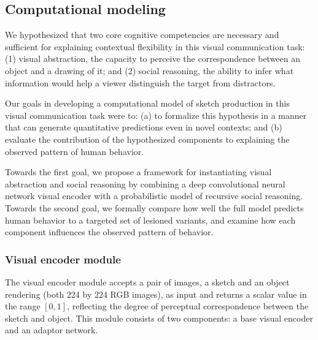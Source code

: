 \documentclass[9pt,twocolumn,twoside]{pnas-new}
\newcommand{\mwu}[1]{{\color{green}{[mwu: #1]}}}
\begin{document}
{%

\subsection*{Computational modeling}

We hypothesized that two core cognitive competencies are necessary and sufficient for explaining contextual flexibility in this visual communication task: (1) visual abstraction, the capacity to perceive the correspondence between an object and a drawing of it; and (2) social reasoning, the ability to infer what information would help a viewer distinguish the target from distractors.

Our goals in developing a computational model of sketch production in this visual communication task were to: (a) to formalize this hypothesis in a manner that can generate quantitative predictions even in novel contexts; and (b) evaluate the contribution of the hypothesized components to explaining the observed pattern of human behavior.\mwu{i think this is interesting -- why make a computational model? expand more maybe? are we claiming that this is how humans think?}

Towards the first goal, we propose a framework for instantiating visual abstraction and social reasoning by combining a deep convolutional neural network visual encoder with a probabilistic model of recursive social reasoning. Towards the second goal, we formally compare how well the full model predicts human behavior to a targeted set of lesioned variants, and examine how each component influences the observed pattern of behavior.

\subsubsection*{Visual encoder module}

\mwu{this section is a huge brain dump - need more sentences to tie paragraphs together.}

The visual encoder module accepts a pair of images, a sketch and an object rendering (both 224 by 224 RGB images), as input and returns a scalar value in the range $[0,1]$, reflecting the degree of perceptual correspondence between the sketch and object. This module consists of two components: a base visual encoder and an adaptor network.

}
\end{document}
